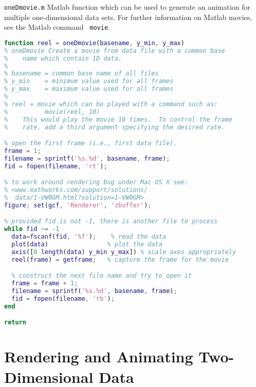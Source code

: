 \begin{program}
{\tt oneDmovie.m} Matlab function which can be used to generate an
animation for multiple one-dimensional data sets.  For further
information on Matlab movies, see the Matlab command {\tt
movie}. \label{pro:animateOneD} 
\codemiddle
\begin{lstlisting}[language=Matlab]
function reel = oneDmovie(basename, y_min, y_max)
% oneDmovie Create a movie from data file with a common base
%    name which contain 1D data.
%
% basename = common base name of all files
% y_min    = minimum value used for all frames
% y_max    = maximum value used for all frames
%
% reel = movie which can be played with a command such as:
%          movie(reel, 10)
%    This would play the movie 10 times.  To control the frame
%    rate, add a third argument specifying the desired rate.

% open the first frame (i.e., first data file).
frame = 1;
filename = sprintf('%s.%d', basename, frame);
fid = fopen(filename, 'rt');

% to work around rendering bug under Mac OS X see:
% <www.mathworks.com/support/solutions/
%  data/1-VW0GM.html?solution=1-VW0GM>
figure; set(gcf, 'Renderer', 'zbuffer');

% provided fid is not -1, there is another file to process
while fid ~= -1
  data=fscanf(fid, '%f');    % read the data
  plot(data)                % plot the data
  axis([0 length(data) y_min y_max]) % scale axes appropriately
  reel(frame) = getframe;   % capture the frame for the movie

  % construct the next file name and try to open it
  frame = frame + 1;
  filename = sprintf('%s.%d', basename, frame);
  fid = fopen(filename, 'rb');
end

return
\end{lstlisting}
\end{program}




\chapter{Rendering and Animating Two-Dimensional Data
\label{ap:render2d}} 


